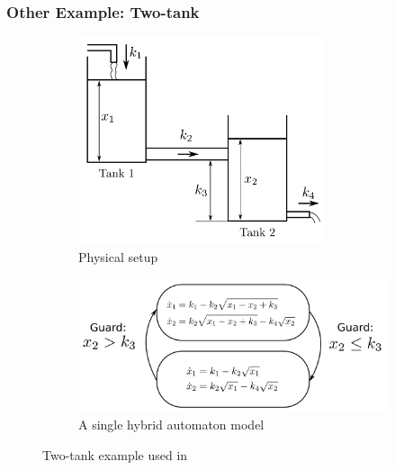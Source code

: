 \begin{frame}[c] \frametitle{ Other Example: Two-tank }
	\begin{figure}
	\centering
	\begin{subfigure}{.4\textwidth}
	  \centering
	  \includegraphics[width=0.8\textwidth]{./fig/diagrams/two-tank-diagram.png}
	  \caption{Physical setup}
	\end{subfigure}%
	\begin{subfigure}{.6\textwidth}
	  \centering
	  \includegraphics[width=1\linewidth]{./fig/diagrams/two-tank-ha.png}
	  \caption{A single hybrid automaton model}
	\end{subfigure}
	\caption{Two-tank example used in }
	\label{fig:test}
	\end{figure}
\end{frame}



